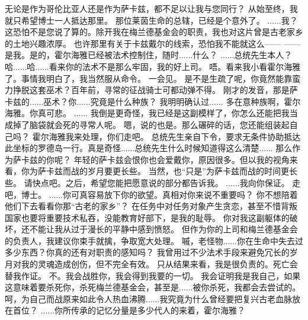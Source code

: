 \documentclass[openany]{book}
\begin{document}
\begin{dialogue}
     无论是作为哥伦比亚人还是作为萨卡兹，都不足以让我与您同行？
     从始至终，我就只希望博士一人抵达那里。
     那位莱茵生命的总辖，已经是个意外了。
     ......我？
     这恐怕不是您说了算的。除开我在梅兰德基金会的职责，我也对这片曾是古老家乡的土地兴趣浓厚。
     也许那里有关于卡兹戴尔的线索，恐怕我不能就这么——
     ——是我。是的，霍尔海雅已经被法术控制住，随时......什么？
     ......总统先生本人？
     哈......哈......看来你的法术不是那么牢固，我的好上司。
     唔。看来我小看霍尔海雅了。事情我明白了，我当然服从命令。
     一会见。
     是不是生疏了呢，你竟然能靠蛮力挣脱这套巫术？百年前，寻常的征战骑士可都动弹不得。
     刚才的发音，那是萨卡兹的......巫术？你......究竟是什么种族？
     我明明确认过......
     多在意种族啊，霍尔海雅。你真可悲。
     ......
     我倒是更奇怪，我已经是这副模样了，你怎么还能把我当成掉了脑袋就会死的寻常人呢。
     嗯，说的也是。那么碾碎的话，您还能组装起自己吗？
     霍尔海雅我来处理，你们走吧。
     总统先生亲自下令，要求无条件协助抵达此坐标的罗德岛一行。真是奇怪......总统先生什么时候知道得这么清楚......
     那么作为萨卡兹的你呢？
     年轻的萨卡兹会恨你也会爱戴你，原因很多。但以我的视角来看，你为萨卡兹而战的岁月要更长些。
     当然，也“只是”为萨卡兹而战的时间更长些。
     请快点吧。之后，希望您能把愿意说的部分都告诉我。
     ......我向你保证。
     走吧，博士。
     ......你可真容易放下你的欲望。真相对你来说不重要吗？
     你不想陪着他们下去看看你那“古老的家乡”？
     在任务中对任务对象产生贪恋，甚至不惜背叛国家也要将重要技术私吞，没能教育好部下，是我的耻辱。
     你对我这副躯体的破坏，还不能让我从过于漫长的平静中感到愤怒。
     但作为你的上司和梅兰德基金会的负责人，我建议你束手就擒，争取宽大处理。
     嘁，老怪物......你在生命中失去过多少东西？你真的还有对职责的感知吗？
     我曾用过不少法术手段来避免冗长的岁月对我的灵魂造成创伤，但不完全有效。
     只从结果来看，我是很负责的。死亡会替我作证。
     不。我会战胜你，我会得到我要的一切。
     我会证明我是我自己，如果这意味着要杀死你，杀死梅兰德基金会，甚至是......被你杀死，我都会去尝试的。
     呵，为自己而战原来如此令人热血沸腾......我究竟为什么曾经要把复兴古老血脉放在首位？
     ......你所传承的记忆分量是多少代人的来着，霍尔海雅？

\end{dialogue}
\end{document}
